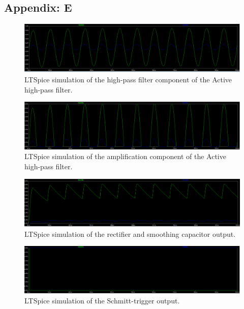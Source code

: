 \subsection*{Appendix: E}

\begin{figure}[H]
\centering
\includegraphics[width=\textwidth]{figures/LTS-filter.PNG}
\caption{LTSpice simulation of the high-pass filter component of the Active high-pass filter.}
\end{figure}

\begin{figure}[H]
\centering
\includegraphics[width=\textwidth]{figures/LTS-gain.PNG}
\caption{LTSpice simulation of the amplification component of the Active high-pass filter.}
\end{figure}

\begin{figure}[H]
\centering
\includegraphics[width=\textwidth]{figures/LTS-rectified.PNG}
\caption{LTSpice simulation of the rectifier and smoothing capacitor output.}
\end{figure}

\begin{figure}[H]
\centering
\includegraphics[width=\textwidth]{figures/LTS-output.PNG}
\caption{LTSpice simulation of the Schmitt-trigger output.}
\end{figure}

